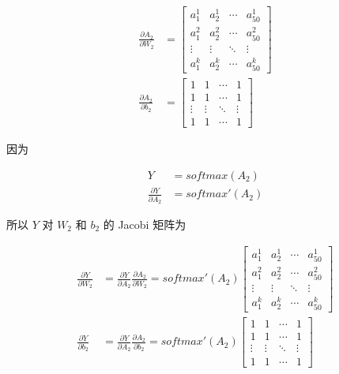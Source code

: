 \documentclass[12pt,a4paper]{amsart}
\begin{document}
\begin{equation}
	\begin{aligned}
		\frac{\partial A_2}{\partial W_2} & = \begin{bmatrix}
			a_1^1  & a_2^1  & \cdots & a_{50}^1 \\
			a_1^2  & a_2^2  & \cdots & a_{50}^2 \\
			\vdots & \vdots & \ddots & \vdots   \\
			a_1^k  & a_2^k  & \cdots & a_{50}^k
		\end{bmatrix} \\
		\frac{\partial A_2}{\partial b_2} & = \begin{bmatrix}
			1      & 1      & \cdots & 1      \\
			1      & 1      & \cdots & 1      \\
			\vdots & \vdots & \ddots & \vdots \\
			1      & 1      & \cdots & 1
		\end{bmatrix}
	\end{aligned}
\end{equation}

因为

\begin{equation}
	\begin{aligned}
		Y                               & = softmax(A_2)  \\
		\frac{\partial Y}{\partial A_2} & = softmax'(A_2)
	\end{aligned}
\end{equation}

所以 $Y$ 对 $W_2$ 和 $b_2$ 的 Jacobi 矩阵为

\begin{equation}
	\begin{aligned}
		\frac{\partial Y}{\partial W_2} & = \frac{\partial Y}{\partial A_2} \frac{\partial A_2}{\partial W_2} = softmax'(A_2) \begin{bmatrix}
			a_1^1  & a_2^1  & \cdots & a_{50}^1 \\
			a_1^2  & a_2^2  & \cdots & a_{50}^2 \\
			\vdots & \vdots & \ddots & \vdots   \\
			a_1^k  & a_2^k  & \cdots & a_{50}^k
		\end{bmatrix} \\
		\frac{\partial Y}{\partial b_2} & = \frac{\partial Y}{\partial A_2} \frac{\partial A_2}{\partial b_2} = softmax'(A_2) \begin{bmatrix}
			1      & 1      & \cdots & 1      \\
			1      & 1      & \cdots & 1      \\
			\vdots & \vdots & \ddots & \vdots \\
			1      & 1      & \cdots & 1
		\end{bmatrix}
	\end{aligned}
\end{equation}
\end{document}

